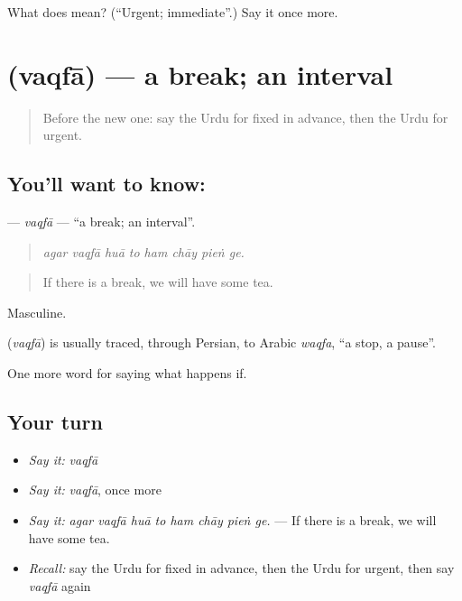 \begin{tcolorbox}[breakable,colback=teal!4,colframe=teal!35!black,title={Before you move on}]
What does  mean? (\textquotedblleft{}Urgent; immediate\textquotedblright{}.) Say it once more.
\end{tcolorbox}
\section[\texorpdfstring{\ur{وقفہ} (vaqfā)}{وقفہ (vaqfā)}]{ (vaqfā) — a break; an interval}

\label{lesson:UR-C526-vaqfa}



\begin{quote}
Before the new one: say the Urdu for fixed in advance, then the Urdu for urgent.
\end{quote}

\subsection*{You'll want to know: }
\textbf{} — \emph{vaqfā} — \textquotedblleft{}a break; an interval\textquotedblright{}.

\begin{quote}
       
\end{quote}

\begin{quote}
\emph{agar vaqfā huā to ham chāy pieṅ ge.}
\end{quote}

\begin{quote}
If there is a break, we will have some tea.
\end{quote}

Masculine.

\begin{cousinweb}
\textbf{} (\emph{vaqfā}) is usually traced, through Persian, to Arabic \emph{waqfa}, \textquotedblleft{}a stop, a pause\textquotedblright{}.
\end{cousinweb}

\begin{grammarlens}[title={What you've built}]
One more word for saying what happens if.
\end{grammarlens}

\subsection*{Your turn}
\begin{itemize}
\raggedright
  \item \emph{Say it:} \emph{vaqfā}
  \item \emph{Say it:} \emph{vaqfā}, once more
  \item \emph{Say it:} \emph{agar vaqfā huā to ham chāy pieṅ ge.} — If there is a break, we will have some tea.
  \item \emph{Recall:} say the Urdu for fixed in advance, then the Urdu for urgent, then say \emph{vaqfā} again
\end{itemize}

